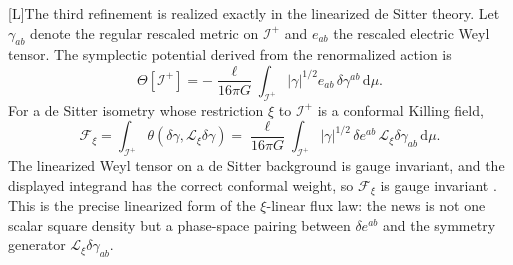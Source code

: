 \documentclass[11pt,a4paper]{article}
\newcommand{\diff}{\mathrm{d}}
\newcommand{\statusL}{\textsf{[L]}}
\begin{document}
\statusL The third refinement is realized exactly in the linearized de Sitter theory.  Let \(\gamma_{ab}\) denote the regular rescaled metric on \(\mathscr I^+\) and \(e_{ab}\) the rescaled electric Weyl tensor.  The symplectic potential derived from the renormalized action is \cite{hoque2025conformal}
\begin{equation}
  \Theta[\mathscr I^+]
  =
  -\frac{\ell}{16\pi G}
  \int_{\mathscr I^+}|\gamma|^{1/2}e_{ab}\,\delta\gamma^{ab}\,\diff\mu .
\end{equation}
For a de Sitter isometry whose restriction \(\xi\) to \(\mathscr I^+\) is a conformal Killing field,
\begin{equation}\label{eq:hamiltonian-flux}
  \mathcal F_\xi
  =
  \int_{\mathscr I^+}\theta(\delta\gamma,\mathcal L_\xi\delta\gamma)
  =
  \frac{\ell}{16\pi G}
  \int_{\mathscr I^+}|\gamma|^{1/2}\,\delta e^{ab}\,\mathcal L_\xi\delta\gamma_{ab}\,\diff\mu .
\end{equation}
The linearized Weyl tensor on a de Sitter background is gauge invariant, and the displayed integrand has the correct conformal weight, so \(\mathcal F_\xi\) is gauge invariant \cite{hoque2025conformal}.  This is the precise linearized form of the \(\xi\)-linear flux law: the news is not one scalar square density but a phase-space pairing between \(\delta e^{ab}\) and the symmetry generator \(\mathcal L_\xi\delta\gamma_{ab}\).
\end{document}

